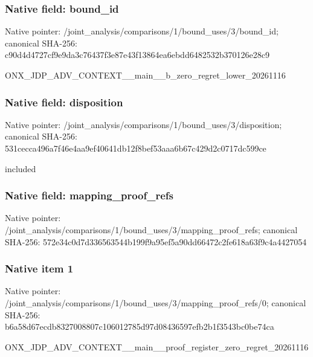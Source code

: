 \documentclass[10pt,a4paper]{article}
\begin{document}
\subsubsection{Native field: bound\_\allowbreak{}id}
Native pointer: /joint\_\allowbreak{}analysis/comparisons/1/bound\_\allowbreak{}uses/3/bound\_\allowbreak{}id; canonical SHA-256: c90d4d4727cf9e9da3c76437f3e87e43f13864ea6ebdd6482532b370126e28c9

\begingroup\raggedright\sloppy ONX\_\allowbreak{}JDP\_\allowbreak{}ADV\_\allowbreak{}CONTEXT\_\allowbreak{}\_\allowbreak{}main\_\allowbreak{}\_\allowbreak{}b\_\allowbreak{}zero\_\allowbreak{}regret\_\allowbreak{}lower\_\allowbreak{}20261116\par\endgroup

\subsubsection{Native field: disposition}
Native pointer: /joint\_\allowbreak{}analysis/comparisons/1/bound\_\allowbreak{}uses/3/disposition; canonical SHA-256: 531cecca496a7f46e4aa9ef40641db12f8bef53aaa6b67c429d2c0717dc599ce

\begingroup\raggedright\sloppy included\par\endgroup

\subsubsection{Native field: mapping\_\allowbreak{}proof\_\allowbreak{}refs}
Native pointer: /joint\_\allowbreak{}analysis/comparisons/1/bound\_\allowbreak{}uses/3/mapping\_\allowbreak{}proof\_\allowbreak{}refs; canonical SHA-256: 572e34c0d7d336563544b199f9a95ef5a90dd66472c2fe618a63f9c4a4427054

\subsubsection{Native item 1}
Native pointer: /joint\_\allowbreak{}analysis/comparisons/1/bound\_\allowbreak{}uses/3/mapping\_\allowbreak{}proof\_\allowbreak{}refs/0; canonical SHA-256: b6a58d67ecdb8327008807c106012785d97d08436597efb2b1f3543bc0be74ca

\begingroup\raggedright\sloppy ONX\_\allowbreak{}JDP\_\allowbreak{}ADV\_\allowbreak{}CONTEXT\_\allowbreak{}\_\allowbreak{}main\_\allowbreak{}\_\allowbreak{}proof\_\allowbreak{}register\_\allowbreak{}zero\_\allowbreak{}regret\_\allowbreak{}20261116\par\endgroup
\end{document}
